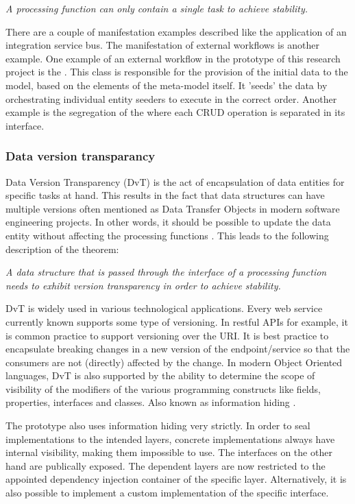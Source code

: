 \textit{A processing function can only contain a single task to achieve stability.}

There are a couple of manifestation examples described like the application of
an integration service bus. The manifestation of external workflows is another example.
One example of an external workflow in the prototype of this research project is the
. This class is responsible for
the provision of the initial data to the model, based on the elements of the meta-model
itself. It 'seeds' the data by orchestrating individual entity seeders to execute in the
correct order. Another example is the segregation of the 
where each CRUD operation is separated in its interface. 

\subsubsection{Data version transparancy}
Data Version Transparency (DvT) is the act of encapsulation of data entities for specific
tasks at hand. This results in the fact that data structures can have multiple versions
often mentioned as Data Transfer Objects in modern software engineering projects. In other
words, it should be possible to update the data entity without affecting the processing
functions \parencite{mannaert_normalized_2016}. This leads to the following description of
the theorem:

\textit{A data structure that is passed through the interface of a processing
function needs to exhibit version transparency in order to achieve stability.}

DvT is widely used in various technological applications. Every web service currently known
supports some type of versioning. In restful APIs for example, it is common practice to
support versioning over the URI. It is best practice to encapsulate breaking changes in a
new version of the endpoint/service so that the consumers are not (directly) affected by
the change. In modern Object Oriented languages, DvT is also supported by the ability to
determine the scope of visibility of the modifiers of the various programming constructs
like fields, properties, interfaces and classes. Also known as information hiding
\parencite{broy_criteria_1972,mannaert_normalized_2016}.

The prototype also uses information hiding very strictly. In order to seal implementations
to the intended layers, concrete implementations always have internal visibility, making
them impossible to use. The interfaces on the other hand are publically exposed. The
dependent layers are now restricted to the appointed dependency injection container of the
specific layer. Alternatively, it is also possible to implement a custom implementation of
the specific interface. 

